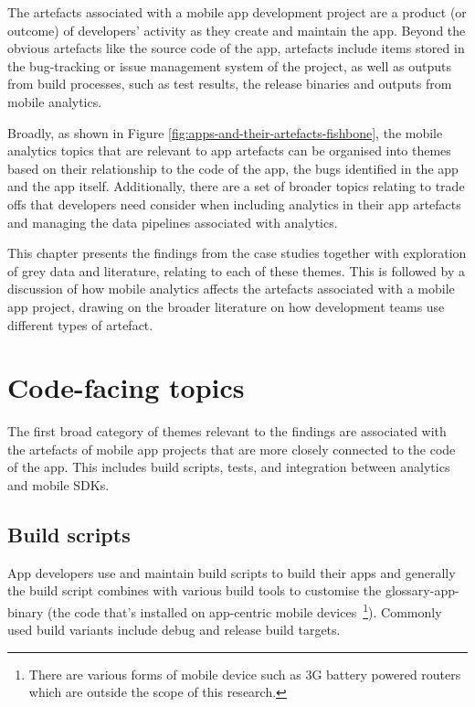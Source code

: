 The artefacts associated with a mobile app development project are a product (or outcome) of developers' activity as they create and maintain the app. Beyond the obvious artefacts like the source code of the app, artefacts include items stored in the bug-tracking or issue management system of the project, as well as outputs from build processes, such as test results, the release binaries and outputs from mobile analytics.

Broadly, as shown in Figure \ref{fig:apps-and-their-artefacts-fishbone}, the mobile analytics topics that are relevant to app artefacts can be organised into themes based on their relationship to the code of the app, the bugs identified in the app and the app itself. Additionally, there are a set of broader topics relating to trade offs that developers need consider when including analytics in their app artefacts and managing the data pipelines associated with analytics.

This chapter presents the findings from the case studies together with exploration of grey data and literature, relating to each of these themes. This is followed by a discussion of how mobile analytics affects the artefacts associated with a mobile app project, drawing on the broader literature on how development teams use different types of artefact.




\section{Code-facing topics}
The first broad category of themes relevant to the findings are associated with the artefacts of mobile app projects that are more closely connected to the code of the app. This includes build scripts, tests, and integration between analytics and mobile SDKs.

\subsection{Build scripts}
App developers use and maintain build scripts to build their apps and generally the build script combines with various build tools to customise the \gls{glossary-app-binary} (the code that's installed on app-centric mobile devices~\footnote{There are various forms of mobile device such as 3G battery powered routers which are outside the scope of this research.}). Commonly used build variants include debug and release build targets. 


